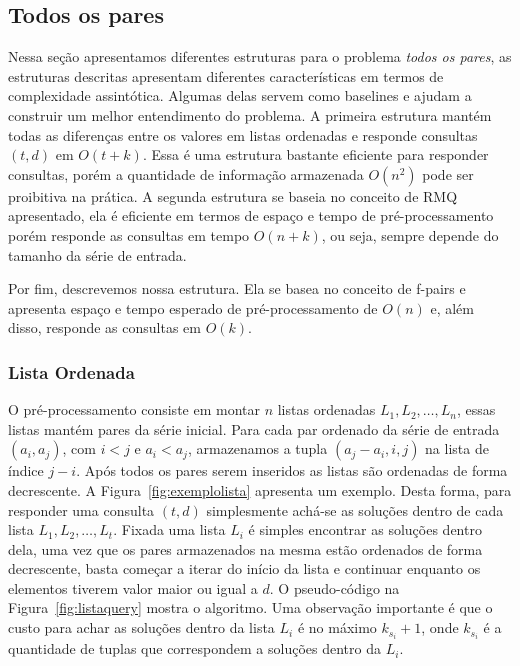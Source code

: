 \documentclass[12pt]{article}
\begin{document}
\subsection{Todos os pares}

Nessa seção apresentamos diferentes estruturas
para o problema \textit{todos os pares}, as estruturas descritas apresentam diferentes
características em termos de complexidade assintótica. Algumas delas
servem como baselines e ajudam a construir um melhor entendimento do problema.
A primeira estrutura mantém todas as diferenças entre os valores 
em listas ordenadas e responde consultas $(t, d)$ em $O(t + k)$. 
Essa é uma estrutura bastante eficiente para responder consultas,
porém a quantidade de informação armazenada $O(n^2)$ pode ser 
proibitiva na prática. A segunda estrutura se baseia no conceito de RMQ apresentado,
ela é eficiente em termos de espaço e tempo de pré-processamento
porém responde as consultas em tempo $O(n + k)$, ou seja,
sempre depende do tamanho da série de entrada. 

Por fim, descrevemos nossa estrutura. Ela se basea
no conceito de f-pairs e apresenta espaço e tempo esperado de 
pré-processamento de $O(n)$ e, além disso, responde as consultas em $O(k)$.


\subsubsection{Lista Ordenada}

O pré-processamento consiste em montar $n$ listas ordenadas $L_1, L_2, \ldots, L_n$, 
essas listas mantém pares da série inicial. Para cada par ordenado da série de entrada $(a_i, a_j)$, com $i < j$ e $a_i < a_j$,
armazenamos a tupla $(a_j - a_i, i, j)$ na lista de índice $j - i$.
Após todos os pares serem inseridos as listas são ordenadas de forma decrescente. A Figura~\ref{fig:exemplolista} apresenta um exemplo.
Desta forma, para responder uma consulta $(t, d)$ simplesmente achá-se as soluções
dentro de cada lista $L_1, L_2, \ldots, L_t$. Fixada uma lista $L_i$ é simples
encontrar as soluções dentro dela, uma vez que os pares armazenados na mesma
estão ordenados de forma decrescente, basta começar a iterar do início
da lista e continuar enquanto os elementos tiverem valor maior ou igual a	$d$.
O pseudo-código na Figura~\ref{fig:listaquery} mostra o algoritmo. Uma observação importante é 
que o custo para achar as soluções dentro da lista $L_i$ é no máximo $k_{s_i} + 1$,
 onde $k_{s_i}$ é a quantidade de tuplas que correspondem a soluções dentro da $L_i$. 
\end{document}
